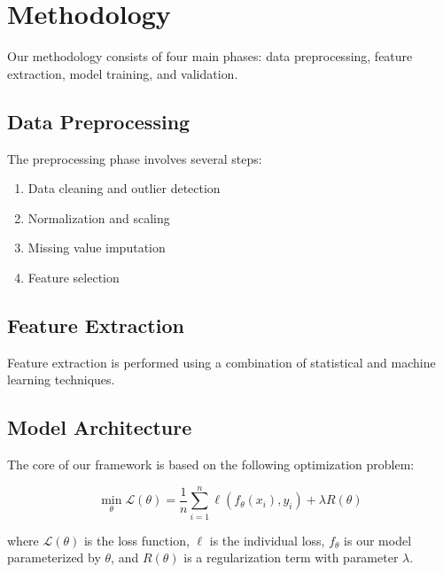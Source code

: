 \documentclass[12pt, letterpaper, onecolumn, final]{article}
\theoremstyle{plain}
\theoremstyle{definition}
\theoremstyle{remark}
\begin{document}
\section{Methodology}
\label{sec:methodology}

\lipsum[21-22] Our methodology consists of four main phases: data preprocessing, feature extraction, model training, and validation.

\subsection{Data Preprocessing}
\label{sec:preprocessing}

\lipsum[23] The preprocessing phase involves several steps:

\begin{enumerate}
    \item Data cleaning and outlier detection
    \item Normalization and scaling
    \item Missing value imputation
    \item Feature selection
\end{enumerate}

\lipsum[24]

\subsection{Feature Extraction}
\label{sec:feature-extraction}

\lipsum[25-26] Feature extraction is performed using a combination of statistical and machine learning techniques.

\subsection{Model Architecture}
\label{sec:architecture}

The core of our framework is based on the following optimization problem:

\begin{equation}
    \min_{\theta} \mathcal{L}(\theta) = \frac{1}{n} \sum_{i=1}^{n} \ell(f_{\theta}(x_i), y_i) + \lambda R(\theta)
    \label{eq:objective}
\end{equation}

where $\mathcal{L}(\theta)$ is the loss function, $\ell$ is the individual loss, $f_{\theta}$ is our model parameterized by $\theta$, and $R(\theta)$ is a regularization term with parameter $\lambda$.
\end{document}
